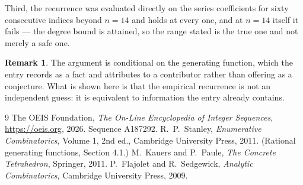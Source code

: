\documentclass[11pt,a4paper]{article}
\theoremstyle{plain}
\theoremstyle{definition}
\newtheorem{remark}[theorem]{Remark}
\begin{document}
Third, the recurrence was evaluated directly on the series coefficients for sixty consecutive
indices beyond $n=14$ and holds at every one, and at $n=14$ itself it fails --- the
degree bound is attained, so the range stated is the true one and not merely a safe one.

\begin{remark}
The argument is conditional on the generating function, which the entry records as a fact and
attributes to a contributor rather than offering as a conjecture. What is shown here is that
the empirical recurrence is not an independent guess: it is equivalent to information the
entry already contains.
\end{remark}

\begin{thebibliography}{9}
 The OEIS Foundation, \emph{The On-Line Encyclopedia of Integer
Sequences}, \url{https://oeis.org}, 2026. Sequence A187292.
 R.~P.~Stanley, \emph{Enumerative Combinatorics}, Volume 1, 2nd ed.,
Cambridge University Press, 2011. (Rational generating functions, Section 4.1.)
 M.~Kauers and P.~Paule, \emph{The Concrete Tetrahedron}, Springer, 2011.
 P.~Flajolet and R.~Sedgewick, \emph{Analytic Combinatorics}, Cambridge
University Press, 2009.
\end{thebibliography}
\end{document}
